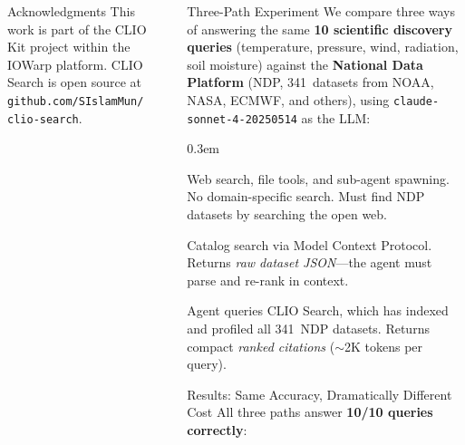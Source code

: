 \documentclass[final]{beamer}
\newlength{\sepwidth}
\newlength{\colwidth}
\newcommand{\separatorcolumn}{\begin{column}{\sepwidth}\end{column}}
\begin{document}
\begin{frame}[t]
\begin{columns}[t]
\begin{column}{\colwidth}
  \begin{block}{Acknowledgments}
    \justifying
    This work is part of the CLIO Kit project within the IOWarp platform.
    CLIO Search is open source at
    \texttt{github.com/SIslamMun/clio-search}.
  \end{block}

\end{column}


\separatorcolumn

\begin{column}{\colwidth}

  \begin{block}{Three-Path Experiment}
    \justifying
    We compare three ways of answering the same \textbf{10 scientific
    discovery queries} (temperature, pressure, wind, radiation, soil
    moisture) against the \textbf{National Data Platform} (NDP,
    341~datasets from NOAA, NASA, ECMWF, and others), using
    \texttt{claude-sonnet-4-20250514} as the LLM:

    \vspace{0.5em}
    \begin{description}
    \justifying
    \itemsep0.3em
      \item[Path 1 --- Claude Native Agent:] Web search, file tools,
        and sub-agent spawning. No domain-specific search. Must find
        NDP datasets by searching the open web.
      \item[Path 2 --- NDP-MCP:] Catalog search via Model Context
        Protocol. Returns \emph{raw dataset JSON}---the agent must
        parse and re-rank in context.
      \item[Path 3 --- CLIO:] Agent queries CLIO Search, which has
        indexed and profiled all 341~NDP datasets. Returns compact
        \emph{ranked citations} ($\sim$2K tokens per query).
    \end{description}
  \end{block}


  \begin{block}{Results: Same Accuracy, Dramatically Different Cost}
    \justifying
    All three paths answer \textbf{10/10 queries correctly}:


\end{block}
\end{column}
\end{columns}
\end{frame}
\end{document}
